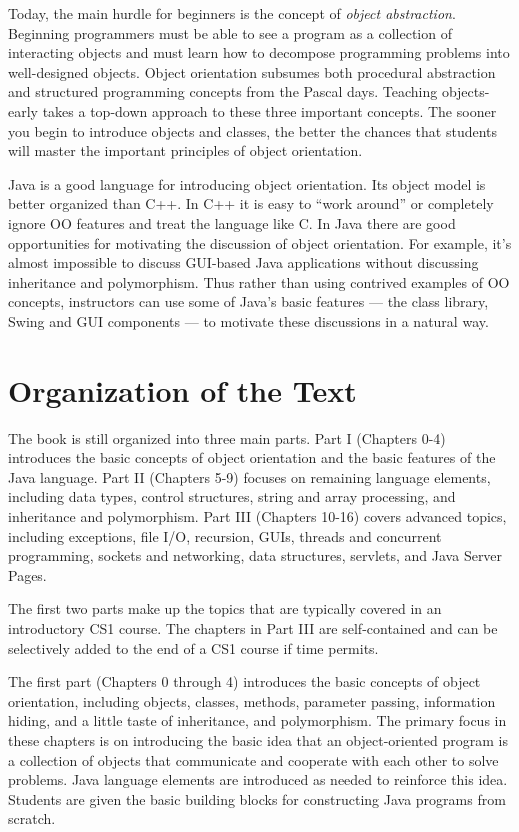 Today, the main hurdle for beginners is the concept of {\it object
abstraction}. Beginning programmers must be able to see a program as a
collection of interacting objects and must learn how to decompose
programming problems into well-designed objects.  Object orientation
subsumes both procedural abstraction and structured programming
concepts from the Pascal days.  Teaching objects-early takes a
top-down approach to these three important concepts.  The sooner you
begin to introduce objects and classes, the better the chances that
students will master the important principles of object orientation.

Java is a good language for introducing object orientation.  Its
object model is better organized than C++. In C++ it is easy to ``work
around'' or completely ignore OO features and treat the language like
C. In Java there are good opportunities for motivating the discussion
of object orientation.  For example, it's almost impossible to discuss
GUI-based Java applications without discussing inheritance and
polymorphism.  Thus rather than using contrived examples of OO
concepts, instructors can use some of Java's basic features ---
the class library, Swing and GUI components --- to motivate these
discussions in a natural way.

\section*{Organization of the Text}

The book is still organized into three main parts. Part I (Chapters
0-4) introduces the basic concepts of object orientation and the basic
features of the Java language.  Part II (Chapters 5-9) focuses on
remaining language elements, including data types, control structures,
string and array processing, and inheritance and polymorphism.  Part
III (Chapters 10-16) covers advanced topics, including exceptions,
file I/O, recursion, GUIs, threads and concurrent programming, sockets
and networking, data structures, servlets, and Java Server Pages.

The first two parts make up the topics that are typically covered in
an introductory CS1 course. The chapters in Part III are
self-contained and can be selectively added to the end of a CS1 course
if time permits.  

The first part (Chapters 0 through 4) introduces the basic concepts of
object orientation, including objects, classes, methods, parameter
passing, information hiding, and a little taste of inheritance, and
polymorphism.  The primary focus in these chapters is on introducing
the basic idea that an object-oriented program is a collection of
objects that communicate and cooperate with each other to solve
problems. Java language elements are introduced as needed
to reinforce this idea.  Students are given the basic building blocks
for constructing Java programs from scratch.  

